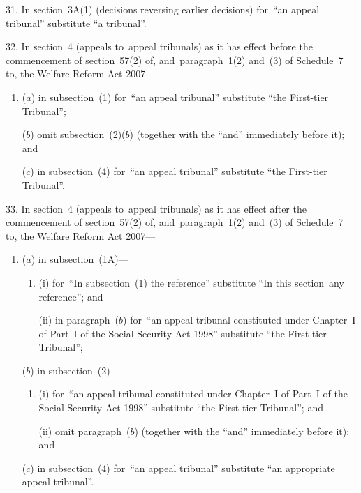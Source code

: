 \documentclass[12pt,a4paper]{article}
\begin{document}
\medskip

31.  In section~3A(1) (decisions reversing earlier decisions) for~“an appeal tribunal” substitute “a tribunal”.

\medskip

32.  In section~4 (appeals to~appeal tribunals) as it has effect before the commencement of section~57(2) of, and~paragraph~1(2) and~(3) of Schedule~7 to, the Welfare Reform Act 2007—
\begin{enumerate}\item[]
($a$) in subsection~(1) for~“an appeal tribunal” substitute “the First-tier Tribunal”;

($b$) omit subsection~(2)($b$)  (together with the “and” immediately before it); and

($c$) in subsection~(4) for~“an appeal tribunal” substitute “the First-tier Tribunal”.
\end{enumerate}

\medskip

33.  In section~4 (appeals to~appeal tribunals) as it has effect after the commencement of section~57(2) of, and~paragraph~1(2) and~(3) of Schedule~7 to, the Welfare Reform Act 2007—
\begin{enumerate}\item[]
($a$) in subsection~(1A)—
\begin{enumerate}\item[]
(i) for~“In subsection~(1) the reference” substitute “In this section~any reference”; and

(ii) in paragraph~($b$)  for~“an appeal tribunal constituted under Chapter~I of Part~I of the Social Security Act 1998” substitute “the First-tier Tribunal”;
\end{enumerate}

($b$) in subsection~(2)—
\begin{enumerate}\item[]
(i) for~“an appeal tribunal constituted under Chapter~I of Part~I of the Social Security Act 1998” substitute “the First-tier Tribunal”; and

(ii) omit paragraph~($b$)  (together with the “and” immediately before it); and
\end{enumerate}

($c$) in subsection~(4) for~“an appeal tribunal” substitute “an appropriate appeal tribunal”.
\end{enumerate}

\medskip
\end{document}
